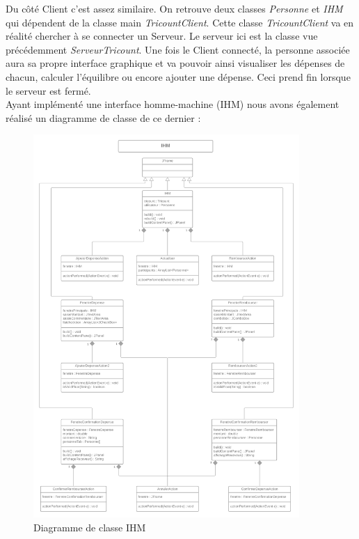 \documentclass[12,french]{report}
\begin{document}
Du côté Client c’est assez similaire. On retrouve deux classes \textit{Personne} et \textit{IHM} qui dépendent de la classe main \textit{TricountClient}. Cette classe \textit{TricountClient} va en réalité chercher à se connecter un Serveur. Le serveur ici est la classe vue précédemment \textit{ServeurTricount}. Une fois le Client connecté, la personne associée aura sa propre interface graphique et va pouvoir ainsi visualiser les dépenses de chacun, calculer l’équilibre ou encore ajouter une dépense. Ceci prend fin lorsque le serveur est fermé.\\

Ayant implémenté une interface homme-machine (IHM) nous avons également réalisé un diagramme de classe de ce dernier :

\begin{figure}[H]
	\center
	\includegraphics[width=0.9\textwidth]{./Images_pooa/Diagramme_de_classe_IHM}
	\caption{Diagramme de classe IHM}
\end{figure}\vspace{0.2cm}
\end{document}
